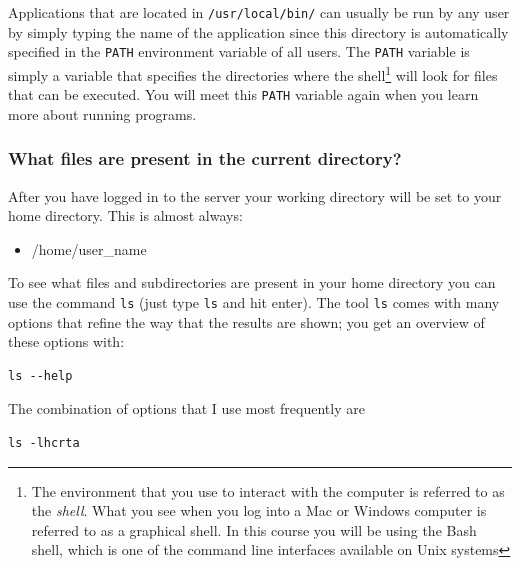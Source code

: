 \documentclass[11pt]{article}
\begin{document}
Applications that are located in \texttt{/usr/local/bin/} can usually be run by any
user by simply typing the name of the application since this directory is automatically specified in the
\texttt{PATH} environment variable of all users. The \texttt{PATH} variable is simply a
variable that specifies the directories where the shell\footnote{The environment that
you use to interact with the computer is referred to as the \emph{shell}. What you see when you
log into a Mac or Windows computer is referred to as a graphical shell. In this course you will
be using the Bash shell, which is one of the command line interfaces available on Unix systems} 
will look for files that can be executed.
You will meet this \texttt{PATH} variable again when you learn more about
running programs.

\subsubsection{What files are present in the current directory?}
\label{sec:orgheadline3}
After you have logged in to the server your working directory will
be set to your home directory. This is almost always:

\begin{itemize}
\item /home/user\_name
\end{itemize}

To see what files and subdirectories are present in your home directory
you can
use the command \texttt{ls} (just type \texttt{ls} and hit enter). The tool \texttt{ls} comes with many
options that refine the way that the results are shown; you get an
overview of these options with:

\begin{verbatim}
ls --help
\end{verbatim}

The combination of options that I use most frequently are

\begin{verbatim}
ls -lhcrta
\end{verbatim}
\end{document}

